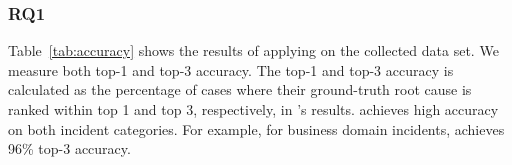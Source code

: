 
\subsubsection{RQ1}

\label{sec:rq1}

\begin{table}[t]
\centering
\caption{Accuracy of RCA by \system and baselines}
 \label{tab:accuracy}
  \vspace{-3.0ex} 
\end{table}


Table~\ref{tab:accuracy} shows the results of applying \system on the collected data set. We measure both top-1 and top-3 accuracy. The top-1 and top-3 accuracy is calculated as the percentage of cases where their ground-truth root cause is ranked within top 1 and top 3, respectively, in \system's results. %
\system achieves high accuracy on both incident categories. For example, for business domain incidents, \system achieves 96\% top-3 accuracy.

